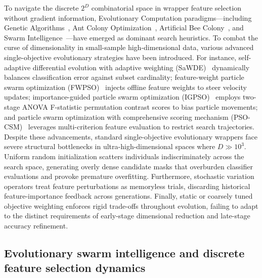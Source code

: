 To navigate the discrete $2^D$ combinatorial space in wrapper feature selection without gradient information, Evolutionary Computation paradigms---including Genetic Algorithms~\cite{huang2006}, Ant Colony Optimization~\cite{aghdam2009}, Artificial Bee Colony~\cite{karaboga2007}, and Swarm Intelligence~\cite{xue2016survey,liang2025}---have emerged as dominant search heuristics. To combat the curse of dimensionality in small-sample high-dimensional data, various advanced single-objective evolutionary strategies have been introduced. For instance, self-adaptive differential evolution with adaptive weighting (SaWDE)~\cite{wang2022} dynamically balances classification error against subset cardinality; feature-weight particle swarm optimization (FWPSO)~\cite{wangjia2022} injects offline feature weights to steer velocity updates; importance-guided particle swarm optimization (IGPSO)~\cite{xuezhang2024} employs two-stage ANOVA F-statistic permutation contrast scores to bias particle movements; and particle swarm optimization with comprehensive scoring mechanism (PSO-CSM)~\cite{wei2025} leverages multi-criterion feature evaluation to restrict search trajectories. Despite these advancements, standard single-objective evolutionary wrappers face severe structural bottlenecks in ultra-high-dimensional spaces where $D \gg 10^3$. Uniform random initialization scatters individuals indiscriminately across the search space, generating overly dense candidate masks that overburden classifier evaluations and provoke premature overfitting. Furthermore, stochastic variation operators treat feature perturbations as memoryless trials, discarding historical feature-importance feedback across generations. Finally, static or coarsely tuned objective weighting enforces rigid trade-offs throughout evolution, failing to adapt to the distinct requirements of early-stage dimensional reduction and late-stage accuracy refinement.

\subsection{Evolutionary swarm intelligence and discrete feature selection dynamics}\label{sec:pso}

